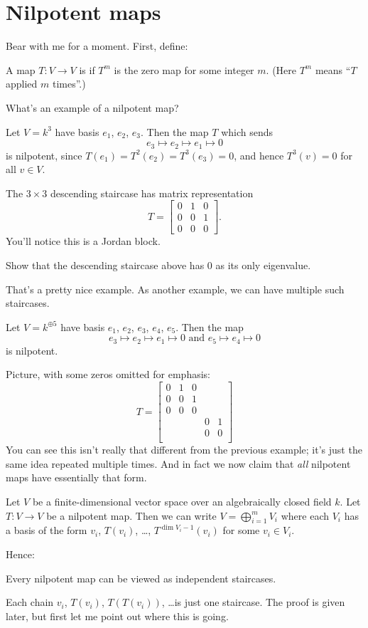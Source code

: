 \section{Nilpotent maps}
Bear with me for a moment.  First, define:
\begin{definition}
	A map $T: V \to V$ is  if $T^m$ is the zero map for some integer $m$.
	(Here $T^m$ means ``$T$ applied $m$ times''.)
\end{definition}
What's an example of a nilpotent map?
\begin{example}
	Let $V = k^3$ have basis $e_1$, $e_2$, $e_3$.
	Then the map $T$ which sends
	\[ e_3 \mapsto e_2 \mapsto e_1 \mapsto 0 \]
	is nilpotent, since $T(e_1) = T^2(e_2) = T^3(e_3) = 0$,
	and hence $T^3(v) = 0$ for all $v \in V$.
\end{example}
The $3 \times 3$ descending staircase has matrix representation
\[ T = \begin{bmatrix}
		0 & 1 & 0 \\
		0 & 0 & 1 \\
		0 & 0 & 0
	\end{bmatrix}. \]
You'll notice this is a Jordan block.
\begin{exercise}
	Show that the descending staircase above
	has $0$ as its only eigenvalue.
\end{exercise}

That's a pretty nice example.
As another example, we can have multiple such staircases.
\begin{example}
	Let $V = k^{\oplus 5}$ have basis $e_1$, $e_2$, $e_3$, $e_4$, $e_5$.
	Then the map
	\[ e_3 \mapsto e_2 \mapsto e_1 \mapsto 0 \text{ and }
		e_5 \mapsto e_4 \mapsto 0 \]
	is nilpotent.
\end{example}
Picture, with some zeros omitted for emphasis:
\[ T = \begin{bmatrix}
		0 & 1 & 0 &   &   \\
		0 & 0 & 1 &   &   \\
		0 & 0 & 0 &   &   \\
		  &   &   & 0 & 1 \\
		  &   &   & 0 & 0 \\
	\end{bmatrix}
\]
You can see this isn't really that different
from the previous example;
it's just the same idea repeated multiple times.
And in fact we now claim that \emph{all}
nilpotent maps have essentially that form.
\begin{theorem}
	Let $V$ be a finite-dimensional vector space
	over an algebraically closed field $k$.
	Let $T \colon V \to V$ be a nilpotent map.
	Then we can write $V = \bigoplus_{i=1}^m V_i$
	where each $V_i$ has a basis of the form
	$v_i$, $T(v_i)$, \dots, $T^{\dim V_i - 1}(v_i)$
	for some $v_i \in V_i$.
\end{theorem}
Hence:
\begin{moral}
	Every nilpotent map can be viewed as independent staircases.
\end{moral}
Each chain $v_i$, $T(v_i)$, $T(T(v_i))$, \dots is just one staircase.
The proof is given later, but first let me point out where this is going.

